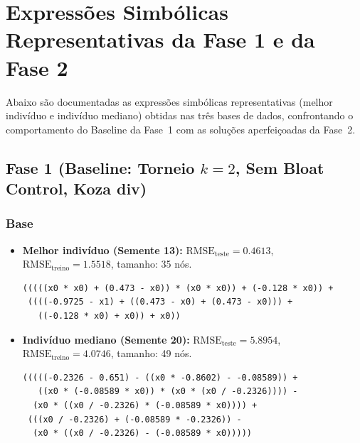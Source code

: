 \section{Expressões Simbólicas Representativas da Fase 1 e da Fase 2}
\label{app:expressoes}

Abaixo são documentadas as expressões simbólicas representativas (melhor indivíduo
e indivíduo mediano) obtidas nas três bases de dados, confrontando o comportamento
do Baseline da Fase~1 com as soluções aperfeiçoadas da Fase~2.

\subsection{Fase 1 (Baseline: Torneio $k=2$, Sem Bloat Control, Koza div)}

\subsubsection{Base }
\begin{itemize}
  \item \textbf{Melhor indivíduo (Semente 13):}
        $\text{RMSE}_{\text{teste}} = 0.4613$, $\text{RMSE}_{\text{treino}} = 1.5518$, tamanho: 35 nós.
\begin{lstlisting}
(((((x0 * x0) + (0.473 - x0)) * (x0 * x0)) + (-0.128 * x0)) +
 ((((-0.9725 - x1) + ((0.473 - x0) + (0.473 - x0))) +
   ((-0.128 * x0) + x0)) + x0))
\end{lstlisting}
  \item \textbf{Indivíduo mediano (Semente 20):}
        $\text{RMSE}_{\text{teste}} = 5.8954$, $\text{RMSE}_{\text{treino}} = 4.0746$, tamanho: 49 nós.
\begin{lstlisting}
(((((-0.2326 - 0.651) - ((x0 * -0.8602) - -0.08589)) +
   ((x0 * (-0.08589 * x0)) * (x0 * (x0 / -0.2326)))) -
  (x0 * ((x0 / -0.2326) * (-0.08589 * x0)))) +
 (((x0 / -0.2326) + (-0.08589 * -0.2326)) -
  (x0 * ((x0 / -0.2326) - (-0.08589 * x0)))))
\end{lstlisting}
\end{itemize}

